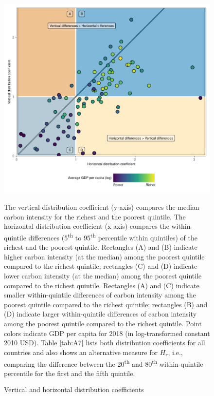 \documentclass[12pt, a4paper]{article}
\newenvironment{subcaption2}
{\strut
\vspace{-5pt}
\begin{minipage}[b]{0.95\textwidth}
  \hspace*{-\parindent}
  \footnotesize}
 {\end{minipage}}
\begin{document}
\begin{figure}[ht!]
    \centering
    \includegraphics{Figure 2/Figure_2_2017_B.pdf}
    \caption{Vertical and horizontal distribution coefficients}
    \label{fig:fig_2}
    \begin{subcaption2}
    The vertical distribution coefficient (y-axis) compares the median carbon intensity for the richest and the poorest quintile. The horizontal distribution coefficient (x-axis) compares the within-quintile differences (5\textsuperscript{th} to 95\textsuperscript{th} percentile within quintiles) of the richest and the poorest quintile. Rectangles (A) and (B) indicate higher carbon intensity (at the median) among the poorest quintile compared to the richest quintile; rectangles (C) and (D) indicate lower carbon intensity (at the median) among the poorest quintile compared to the richest quintile. Rectangles (A) and (C) indicate smaller within-quintile differences of carbon intensity among the poorest quintile compared to the richest quintile; rectangles (B) and (D) indicate larger within-quintile differences of carbon intensity among the poorest quintile compared to the richest quintile. Point colors indicate GDP per capita for 2018 (in log-transformed constant 2010 USD). Table \ref{tab:A7} lists both distribution coefficients for all countries and also shows an alternative measure for $\widehat{H_{r}}$, i.e., comparing the difference between the 20\textsuperscript{th} and 80\textsuperscript{th} within-quintile percentile for the first and the fifth quintile.
    \end{subcaption2}
\end{figure}
\end{document}
